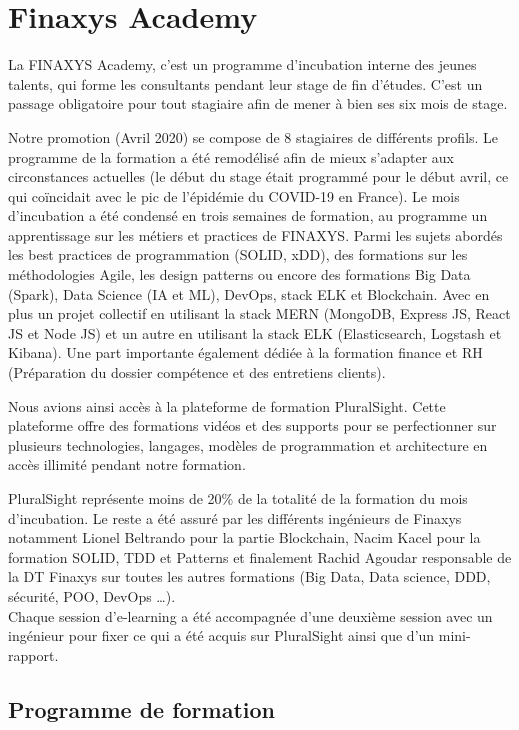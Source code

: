 \section{Finaxys Academy} 
\par La FINAXYS Academy, c’est un programme d'incubation interne des jeunes talents, qui forme les consultants pendant leur stage de fin d’études. C'est un passage obligatoire pour tout stagiaire afin de mener à bien ses six mois de stage. 
\par Notre promotion (Avril 2020) se compose de 8 stagiaires de différents profils. Le programme de la formation a été remodélisé afin de mieux s'adapter aux circonstances actuelles (le début du stage était programmé pour le début avril, ce qui coïncidait avec le pic de l'épidémie du COVID-19 en France). Le mois d'incubation a été condensé en trois semaines de formation, au programme un apprentissage sur les métiers et practices de FINAXYS. Parmi les sujets abordés les best practices de programmation (SOLID, xDD), des formations sur les méthodologies Agile, les design patterns ou encore des formations Big Data (Spark), Data Science (IA et ML), DevOps, stack ELK  et Blockchain. Avec en plus un projet collectif en utilisant la stack MERN (MongoDB, Express JS, React JS et Node JS) et un autre en utilisant la stack ELK (Elasticsearch, Logstash et Kibana). Une part importante également dédiée à la formation finance et RH (Préparation du dossier compétence et des entretiens clients). 
\par Nous avions ainsi accès à la plateforme de formation PluralSight. Cette plateforme offre des formations vidéos et des supports pour se perfectionner sur plusieurs technologies, langages, modèles de programmation et architecture en accès illimité pendant notre formation.
\par PluralSight représente moins de 20\% de la totalité de la formation du mois d'incubation. Le reste a été assuré par les différents ingénieurs de Finaxys notamment Lionel Beltrando pour la partie Blockchain, Nacim Kacel pour la formation SOLID, TDD et Patterns et finalement Rachid Agoudar responsable de la DT Finaxys sur toutes les autres formations (Big Data, Data science, DDD, sécurité, POO, DevOps \dots).  \\
Chaque session d'e-learning a été accompagnée d'une deuxième session avec un ingénieur pour fixer ce qui a été acquis sur PluralSight ainsi que d'un mini-rapport.


\subsection{Programme de formation}


